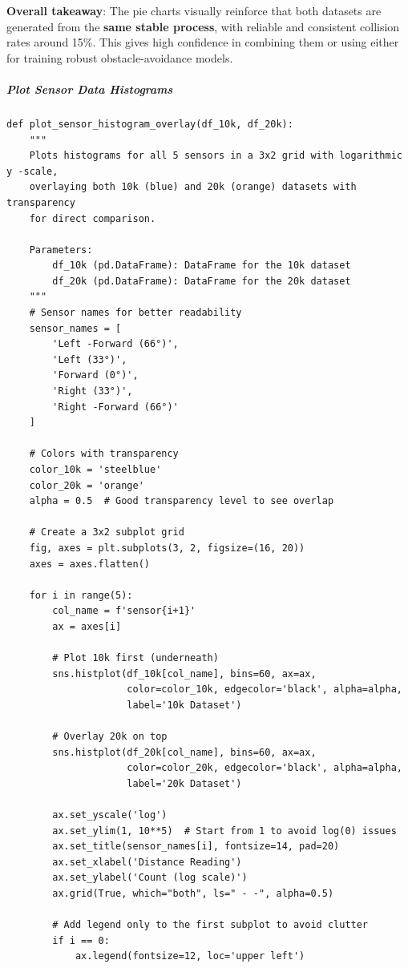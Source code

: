 \textbf{Overall takeaway}: The pie charts visually reinforce that both datasets are generated from the \textbf{same stable process}, with reliable and consistent collision rates around 15\%. This gives high confidence in combining them or using either for training robust obstacle-avoidance models.

\subparagraph{Plot Sensor Data Histograms}

\begin{verbatim}
def plot_sensor_histogram_overlay(df_10k, df_20k):
    """
    Plots histograms for all 5 sensors in a 3x2 grid with logarithmic y -scale,
    overlaying both 10k (blue) and 20k (orange) datasets with transparency
    for direct comparison.
    
    Parameters:
        df_10k (pd.DataFrame): DataFrame for the 10k dataset
        df_20k (pd.DataFrame): DataFrame for the 20k dataset
    """
    # Sensor names for better readability
    sensor_names = [
        'Left -Forward (66°)',
        'Left (33°)',
        'Forward (0°)',
        'Right (33°)',
        'Right -Forward (66°)'
    ]
    
    # Colors with transparency
    color_10k = 'steelblue'
    color_20k = 'orange'
    alpha = 0.5  # Good transparency level to see overlap
    
    # Create a 3x2 subplot grid
    fig, axes = plt.subplots(3, 2, figsize=(16, 20))
    axes = axes.flatten()
    
    for i in range(5):
        col_name = f'sensor{i+1}'
        ax = axes[i]
        
        # Plot 10k first (underneath)
        sns.histplot(df_10k[col_name], bins=60, ax=ax,
                     color=color_10k, edgecolor='black', alpha=alpha,
                     label='10k Dataset')
        
        # Overlay 20k on top
        sns.histplot(df_20k[col_name], bins=60, ax=ax,
                     color=color_20k, edgecolor='black', alpha=alpha,
                     label='20k Dataset')
        
        ax.set_yscale('log')
        ax.set_ylim(1, 10**5)  # Start from 1 to avoid log(0) issues
        ax.set_title(sensor_names[i], fontsize=14, pad=20)
        ax.set_xlabel('Distance Reading')
        ax.set_ylabel('Count (log scale)')
        ax.grid(True, which="both", ls=" - -", alpha=0.5)
        
        # Add legend only to the first subplot to avoid clutter
        if i == 0:
            ax.legend(fontsize=12, loc='upper left')
    

\end{verbatim}
